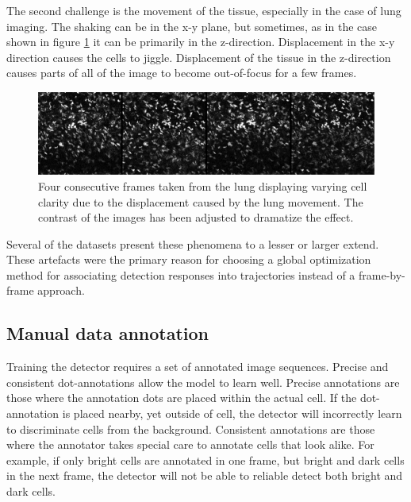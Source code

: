 	The second challenge is the movement of the tissue, especially in the case of lung imaging. The shaking can be in the x-y plane, but sometimes, as in the case shown in figure \cref{fig:data_challenges_movement} it can be primarily in the z-direction. Displacement in the x-y direction causes the cells to jiggle. Displacement of the tissue in the z-direction causes parts of all of the image to become out-of-focus for a few frames.
	
	\begin{figure}[h]
		\includegraphics[width=\textwidth]{images/data_challenge_movement}

		\caption{Four consecutive frames taken from the lung displaying varying cell clarity due to the displacement caused by the lung movement. The contrast of the images has been adjusted to dramatize the effect.}
		\label{fig:data_challenges_movement}
	\end{figure}
	
	Several of the datasets present these phenomena to a lesser or larger extend. These artefacts were the primary reason for choosing a global optimization method for associating detection responses into trajectories instead of a frame-by-frame approach.
	
	\subsection{Manual data annotation \statusfirstdraft}
	\label{sec:data_manual_annotation}
	Training the detector requires a set of annotated image sequences. Precise and consistent dot-annotations allow the model to learn well. Precise annotations are those where the annotation dots are placed within the actual cell. If the dot-annotation is placed nearby, yet outside of cell, the detector will incorrectly learn to discriminate cells from the background. Consistent annotations are those where the annotator takes special care to annotate cells that look alike. For example, if only bright cells are annotated in one frame, but bright and dark cells in the next frame, the detector will not be able to reliable detect both bright and dark cells.
	

